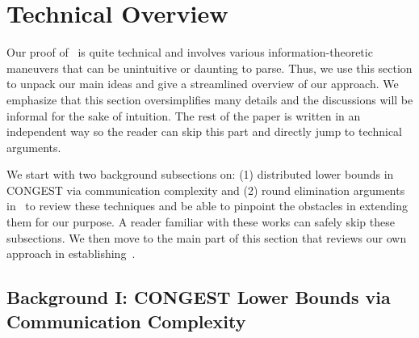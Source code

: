 \documentclass[11pt]{article}
\theoremstyle{definition}
\newcommand{\rv}[1]{\ensuremath{{\mathsf{#1}}}\xspace}
\begin{document}
\newcommand{\Gstar}{\ensuremath{G^*}}

\newcommand{\rL}{\rv{L}}
\newcommand{\rK}{\rv{K}}
\newcommand{\rW}{\rv{W}}

\newcommand{\rtype}[1]{\rv{type}(#1)}

\section{Technical Overview}\label{sec:overview}

Our proof of~ is quite technical and involves various information-theoretic maneuvers that can be unintuitive or daunting to parse. Thus, we 
use this section to unpack our main ideas and give a streamlined overview of our approach. We emphasize that this section oversimplifies many details and the discussions will be informal for the sake of intuition.
The rest of the paper is written in an independent way so the reader can skip this part and directly jump to technical arguments.

We start with two background subsections on: (1) distributed lower bounds in CONGEST via communication complexity and (2) 
round elimination arguments in~\cite{AlonNRW15,AssadiKZ22,AssadiKNS24,AssadiBKNS25} to review these techniques and be able to pinpoint the obstacles 
in extending them for our purpose. A reader familiar with these works can safely skip these subsections. We then move to the main part of this section that reviews our own approach in establishing~. 

\subsection{Background I: CONGEST Lower Bounds via Communication Complexity}\label{sec:congest-lower-background}
\end{document}
